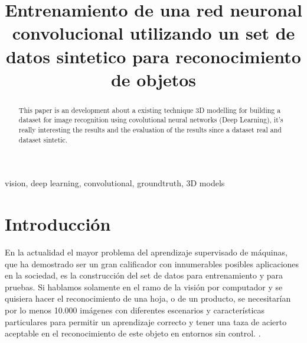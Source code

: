 \documentclass[conference]{IEEEtran}
\begin{document}
\title{Entrenamiento de una red neuronal convolucional utilizando un set de datos sintetico para reconocimiento de objetos\\
}


\author{
}

\maketitle

\begin{abstract}
This paper is an development about a existing technique 3D modelling for building a dataset for image recognition using covolutional neural networks (Deep Learning), it's really interesting the results and the evaluation of the results since a dataset real and dataset sintetic.
\end{abstract}


\begin{IEEEkeywords}
vision, deep learning, convolutional, groundtruth, 3D models
\end{IEEEkeywords}

\section{Introducci\'on}

En la actualidad  el mayor problema del aprendizaje supervisado de máquinas, que ha demostrado ser un gran calificador con innumerables posibles aplicaciones en la sociedad, es la construcción del set de datos para entrenamiento y para pruebas. Si hablamos solamente en el ramo de la visión por computador y se quisiera hacer el reconocimiento de una hoja, o de un producto, se necesitarían por lo menos 10.000 imágenes con diferentes escenarios y características particulares para permitir un aprendizaje correcto y tener una taza de acierto aceptable en el reconocimiento de este objeto en entornos sin control. \cite{b1}.
\end{document}
